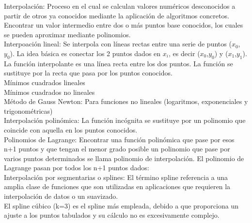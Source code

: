
Interpolaci\'on: Proceso en el cual se calculan valores num\'ericos desconocidos a partir de otros ya conocidos mediante la aplicaci\'on de algoritmos concretos.\\
Encontrar un valor intermedio entre dos o m\'as puntos base conocidos, los cuales se pueden aproximar mediante polinomios.\\

Interpoaci\'on lineal: Se interpola con l\'ineas rectas entre una serie de puntos ($x_0$, $y_0$). La idea b\'asica es conectar los 2 puntos dados en $x_i$, es decir ($x_0$,$y_0$) y %
($x_1$,$y_1$). 
La funci\'on interpolante es una l\'inea recta entre los dos puntos. La funci\'on se sustituye por la recta que pasa por los puntos conocidos.\\

M\'inimos cuadrados lineales\\
M\'inimos cuadrados no lineales\\
M\'etodo de Gauss Newton: Para funciones no lineales (logaritmos, exponenciales y trigonom\'etricas)\\

Interpolaci\'on polin\'omica: La funci\'on inc\'ognita se sustituye por un polinomio que coincide con aquella en los puntos conocidos.\\

Polinomios de Lagrange: Encontrar una funci\'on polin\'omica que pase por esos n+1 puntos y que tengan el menor grado posible un polinomio que pase por varios puntos determinados se llama polinomio de interpolaci\'on. El polinomio de Lagrange pasan por todos los n+1 puntos dados:\\

Interpolaci\'on por segmentarias o splines: El t\'ermino spline referencia a una amplia clase de funciones que son utilizadas en aplicaciones que requieren la interpolaci\'on de datos o un suavizado.\\ %
El spline c\'ubico (k=3) es el spline m\'as empleada, debido a que proporciona un ajuste a los puntos tabulados y su c\'alculo no es excesivamente complejo.\\